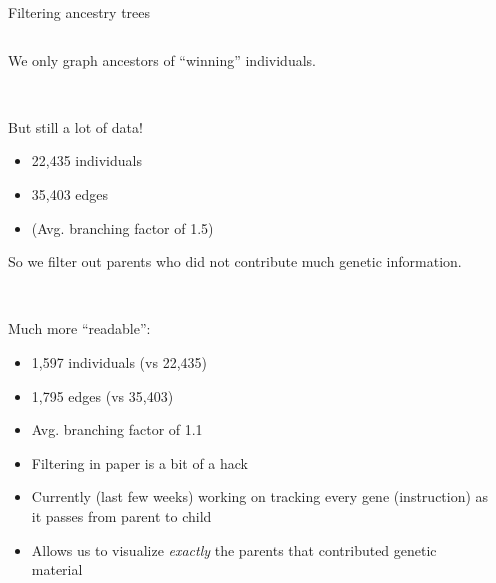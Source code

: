 \documentclass{beamer}
\begin{document}
\begin{frame}{Filtering ancestry trees}
\begin{columns}
\begin{column}{.6\textwidth}
\begin{overprint}
We only graph ancestors of ``winning'' individuals.

~

But still a lot of data!
\begin{itemize}
\item 22,435 individuals
\item 35,403 edges
\item (Avg. branching factor of 1.5)
\end{itemize}


So we filter out parents who did not contribute much genetic information.

~

Much more ``readable'':
\begin{itemize}
	\item 1,597 individuals (vs 22,435)
    \item 1,795 edges (vs 35,403)
    \item Avg. branching factor of 1.1
\end{itemize}

\begin{itemize}
\item Filtering in paper is a bit of a hack
\item Currently (last few weeks) working on tracking every gene (instruction) as it passes from parent to child
\item Allows us to visualize \emph{exactly} the parents that contributed genetic material
\end{itemize}
\end{overprint}

\end{column}
\begin{column}{.4\textwidth}
\begin{overprint}
\end{overprint}
\end{column}
\end{columns}
\end{frame}
\end{document}
